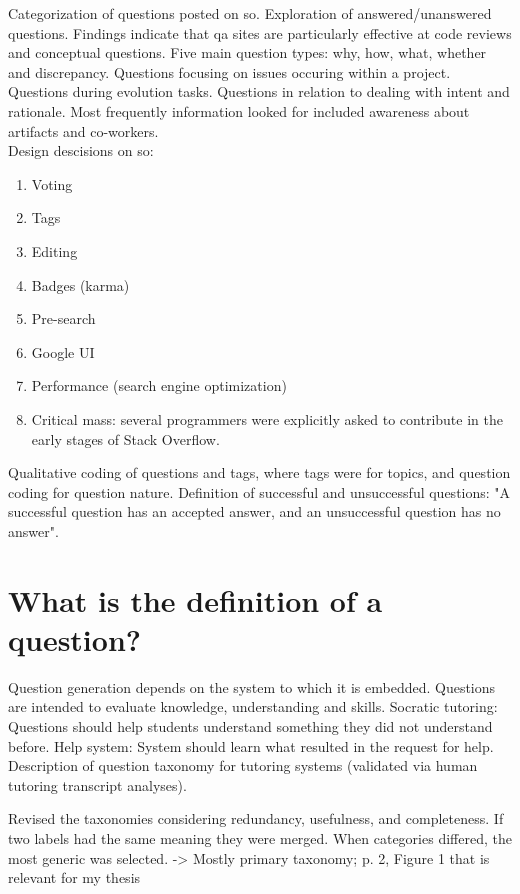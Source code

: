 Categorization of questions posted on \gls{so}. Exploration of answered/unanswered questions. 
Findings indicate that \gls{qa} sites are particularly effective at code reviews and conceptual questions.
Five main question types: why, how, what, whether and discrepancy. 
Questions focusing on issues occuring within a project.
Questions during evolution tasks. 
Questions in relation to dealing with intent and rationale.
Most frequently information looked for included awareness about artifacts and co-workers. \\
Design descisions on \gls{so}:
\begin{enumerate}
	\item Voting
	\item Tags
	\item Editing
	\item Badges (karma)
	\item Pre-search
	\item Google UI
	\item Performance (search engine optimization)
	\item Critical mass: several programmers were explicitly asked to contribute in the early stages of Stack Overflow.
\end{enumerate}
Qualitative coding of questions and tags, where tags were for topics, and question coding for question nature. 
Definition of successful and unsuccessful questions: "A successful question has an accepted answer, and an unsuccessful question has no answer".
\cite{Treude2011}



\section{What is the definition of a question?}
\label{sec:question_definition}

Question generation depends on the system to which it is embedded. 
Questions are intended to evaluate knowledge, understanding and skills. 
Socratic tutoring: Questions should help students understand something they did not understand before. 
Help system: System should learn what resulted in the request for help. 
Description of question taxonomy for tutoring systems (validated via human tutoring transcript analyses).

Revised the taxonomies considering redundancy, usefulness, and completeness. 
If two labels had the same meaning they were merged. 
When categories differed, the most generic was selected.
	-> Mostly primary taxonomy; p. 2, Figure 1 that is relevant for my thesis
\cite{Nielsen2008}


